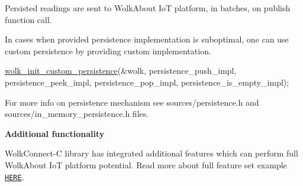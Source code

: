 Persisted readings are sent to Wolk\+About IoT platform, in batches, on publish function call.

In cases when provided persistence implementation is suboptimal, one can use custom persistence by providing custom implementation.


\begin{DoxyCode}
\hyperlink{wolk__connector_8h_a4cb5cc0164b0ab19f9b2bf36d28e9913}{wolk\_init\_custom\_persistence}(&wolk,
                             persistence\_push\_impl,
                             persistence\_peek\_impl, persistence\_pop\_impl,
                             persistence\_is\_empty\_impl);
\end{DoxyCode}


For more info on persistence mechanism see {\ttfamily sources/persistence.\+h} and {\ttfamily sources/in\+\_\+memory\+\_\+persistence.\+h} files.

{\bfseries Additional functionality}

Wolk\+Connect-\/C library has integrated additional features which can perform full Wolk\+About IoT platform potential. Read more about full feature set example \href{https://github.com/Wolkabout/WolkConnect-C/tree/master/examples/full_feature_set}{\tt H\+E\+RE}. 